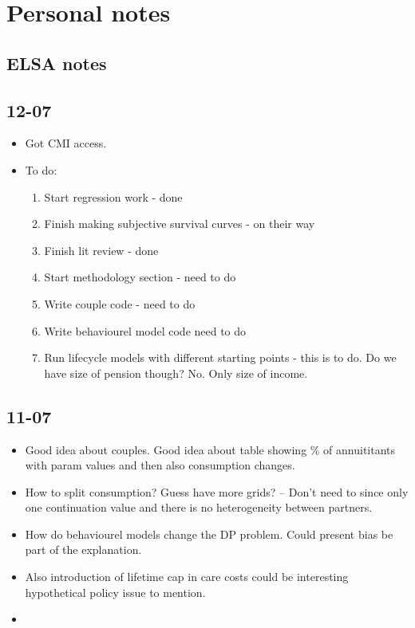 \documentclass[12pt]{article}
\begin{document}
\section{Personal notes}

\subsection{ELSA notes}

\subsection{\textbf{12-07}}
\begin{itemize}

    \item Got CMI access.

    \item To do: \begin{enumerate}
              \item Start regression work - done
              \item Finish making subjective survival curves - on their way
              \item Finish lit review - done
              \item Start methodology section - need to do
              \item Write couple code - need to do
              \item Write behaviourel model code need to do
              \item Run lifecycle models with different starting points - this is to do.
                    Do we have size of pension though? No. Only size of income.
          \end{enumerate}
\end{itemize}

\subsection{\textbf{11-07}}
\begin{itemize}
    \item Good idea about couples. Good idea about table showing \% of annuititants
          with param values and then also consumption changes.

    \item How to split consumption? Guess have more grids? -- Don't need to since only one
          continuation value and there is no heterogeneity between partners.
    \item How do behaviourel models change the DP problem. Could present bias
          be part of the explanation.

    \item Also introduction of lifetime cap in care costs could be interesting
          hypothetical policy issue to mention.

    \item
\end{itemize}
\end{document}
